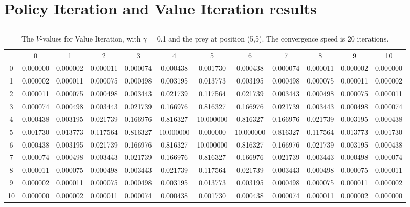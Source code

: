\documentclass{article}
\begin{document}
\newpage
\section{Policy Iteration and Value Iteration results} \label{app:values}
\subsection*{}
\begin{table}[htbp]
\centering         
                \begin{footnotesize}  
					\begin{tabular} {c c c c c c c c c c c c}
					 & 0 & 1 & 2 & 3 & 4 & 5 & 6 & 7 & 8 & 9 & 10 \\
					0 & 0.000000 & 0.000002 & 0.000011 & 0.000074 & 0.000438 & 0.001730 & 0.000438 & 0.000074 & 0.000011 & 0.000002 & 0.000000\\
					1 & 0.000002 & 0.000011 & 0.000075 & 0.000498 & 0.003195 & 0.013773 & 0.003195 & 0.000498 & 0.000075 & 0.000011 & 0.000002\\
					2& 0.000011 & 0.000075 & 0.000498 & 0.003443 & 0.021739 & 0.117564 & 0.021739 & 0.003443 & 0.000498 & 0.000075 & 0.000011\\
					3 & 0.000074 & 0.000498 & 0.003443 & 0.021739 & 0.166976 & 0.816327 & 0.166976 & 0.021739 & 0.003443 & 0.000498 & 0.000074\\
					4 & 0.000438 & 0.003195 & 0.021739 & 0.166976 & 0.816327 & 10.000000 & 0.816327 & 0.166976 & 0.021739 & 0.003195 & 0.000438\\
					5 & 0.001730 & 0.013773 & 0.117564 & 0.816327 & 10.000000 & 0.000000 & 10.000000 & 0.816327 & 0.117564 & 0.013773 & 0.001730\\
					6 & 0.000438 & 0.003195 & 0.021739 & 0.166976 & 0.816327 & 10.000000 & 0.816327 & 0.166976 & 0.021739 & 0.003195 & 0.000438\\
					7 & 0.000074 & 0.000498 & 0.003443 & 0.021739 & 0.166976 & 0.816327 & 0.166976 & 0.021739 & 0.003443 & 0.000498 & 0.000074\\
					8 & 0.000011 & 0.000075 & 0.000498 & 0.003443 & 0.021739 & 0.117564 & 0.021739 & 0.003443 & 0.000498 & 0.000075 & 0.000011\\
					9 & 0.000002 & 0.000011 & 0.000075 & 0.000498 & 0.003195 & 0.013773 & 0.003195 & 0.000498 & 0.000075 & 0.000011 & 0.000002\\
					10 & 0.000000 & 0.000002 & 0.000011 & 0.000074 & 0.000438 & 0.001730 & 0.000438 & 0.000074 & 0.000011 & 0.000002 & 0.000000\\
					\end{tabular}					
\caption{The $V$-values for Value Iteration, with $\gamma$ = 0.1 and the prey at position (5,5). The convergence speed is 20 iterations.}
                \end{footnotesize}                
\label{valueiterationone}
\end{table}
\end{document}
